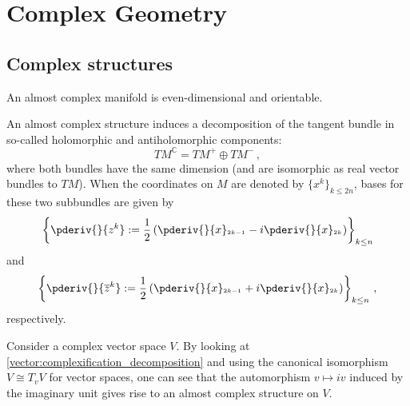 \chapter{Complex Geometry}\label{chapter:complex_geometry}

\section{Complex structures}


    \begin{property}
        An almost complex manifold is even-dimensional and orientable.
    \end{property}

    An almost complex structure induces a decomposition of the tangent bundle in so-called holomorphic and antiholomorphic components:\[TM^{\mathbb{C}} = TM^+\oplus TM^-\,,\] where both bundles have the same dimension (and are isomorphic as real vector bundles to $TM$). When the coordinates on $M$ are denoted by $\{x^k\}_{k\leq 2n}$, bases for these two subbundles are given by \[\left\{\pderiv{}{z^k} := \frac{1}{2}\left(\pderiv{}{x}_{^{2k-1}} - i\pderiv{}{x}_{^{2k}}\right)\right\}_{k\leq n}\] and \[\left\{\pderiv{}{\overline{z}^k} := \frac{1}{2}\left(\pderiv{}{x}_{^{2k-1}} + i\pderiv{}{x}_{^{2k}}\right)\right\}_{k\leq n}\,,\] respectively.

    \begin{example}
        Consider a complex vector space $V$. By looking at \cref{vector:complexification_decomposition} and using the canonical isomorphism $V\cong T_vV$ for vector spaces, one can see that the automorphism $v\mapsto iv$ induced by the imaginary unit gives rise to an almost complex structure on $V$.
    \end{example}

